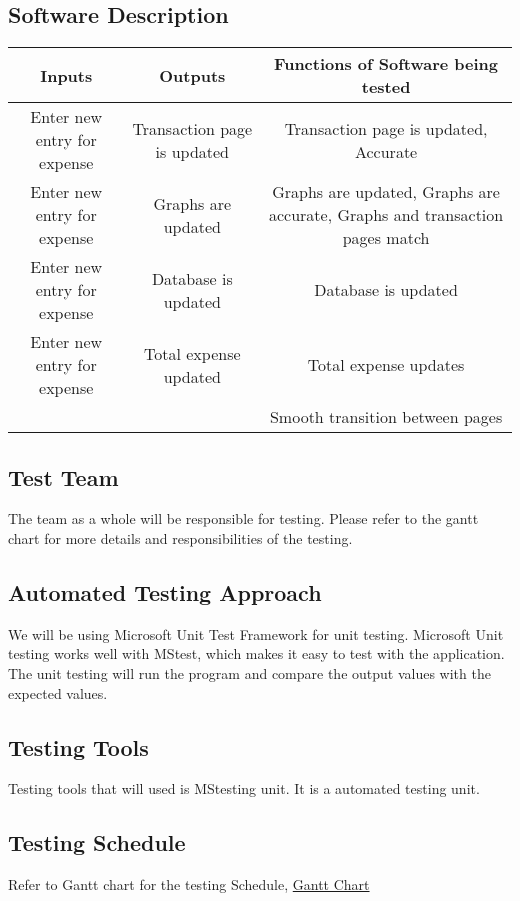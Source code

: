 \documentclass[12pt, titlepage]{article}
\begin{document}
\subsection{Software Description}

\begin{center}
\begin{adjustbox}{width=\textwidth,totalheight=\textheight,keepaspectratio}
\begin{tabularx}{\linewidth}{ |c| c| c| }
\hline
Inputs & Outputs & Functions of Software being tested \\ 
\hline
 Enter new entry for expense & Transaction page is updated & Transaction page is updated, Accurate\\ 
 \hline
Enter new entry for expense & Graphs are updated & Graphs are updated, Graphs are accurate, Graphs and transaction pages match\\
\hline
Enter new entry for expense& Database is updated & Database is updated \\ 
\hline
Enter new entry for expense& Total expense updated & Total expense updates \\ 
\hline
&  &Smooth transition between pages \\ 
\hline
\end{tabularx}
\end{adjustbox}

\end{center}

\subsection{Test Team}
The team as a whole will be responsible for testing. Please refer to the gantt chart for more details and responsibilities of the testing.

\subsection{Automated Testing Approach}
We will be using Microsoft Unit Test Framework for unit testing. Microsoft Unit testing works well with MStest, which makes it easy to test with the application. The unit testing will run the program and compare the output values with the expected values.
\subsection{Testing Tools}
Testing tools that will used is MStesting unit. It is a automated testing unit.
\subsection{Testing Schedule}
Refer to Gantt chart for the testing Schedule, \href{run:../../ProjectSchedule/Gantt Chart.gan}{Gantt Chart} 
\end{document}

